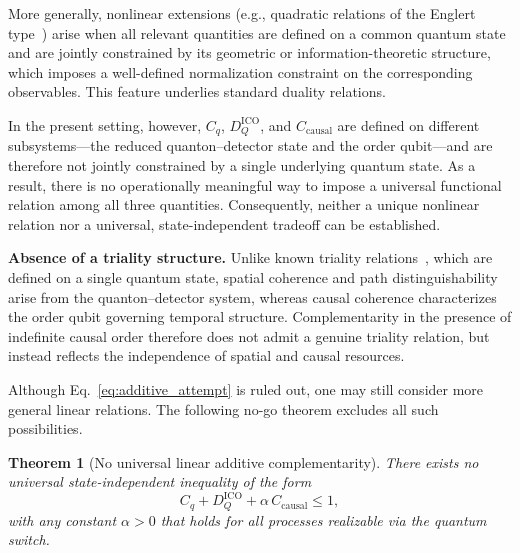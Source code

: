 \documentclass[aps,pra,reprint,superscriptaddress]{revtex4-2}
\newtheorem{theorem}{Theorem}[section]
\begin{document}
More generally, nonlinear extensions (e.g., quadratic relations of the Englert type~\cite{Englert}) arise when all relevant quantities are defined on a common quantum state and are jointly constrained by its geometric or information-theoretic structure, which imposes a well-defined normalization constraint on the corresponding observables. This feature underlies standard duality relations.

In the present setting, however, $C_q$, $D_Q^{\mathrm{ICO}}$, and $C_{\mathrm{causal}}$ are defined on different subsystems—the reduced quanton--detector state and the order qubit—and are therefore not jointly constrained by a single underlying quantum state. As a result, there is no operationally meaningful way to impose a universal functional relation among all three quantities. Consequently, neither a unique nonlinear relation nor a universal, state-independent tradeoff can be established.

\medskip

\noindent\textbf{Absence of a triality structure.}
Unlike known triality relations~\cite{Jakob2010,Qian2018,Roy2022}, which are defined on a single quantum state, spatial coherence and path distinguishability arise from the quanton--detector system, whereas causal coherence characterizes the order qubit governing temporal structure. Complementarity in the presence of indefinite causal order therefore does not admit a genuine triality relation, but instead reflects the independence of spatial and causal resources.

\medskip

Although Eq.~\eqref{eq:additive_attempt} is ruled out, one may still consider more general linear relations. The following no-go theorem excludes all such possibilities.

\begin{theorem}[No universal linear additive complementarity]
There exists no universal state-independent inequality of the form
\begin{equation}
C_q + D_Q^{\mathrm{ICO}} + \alpha\, C_{\mathrm{causal}} \le 1 ,
\label{eq:no_go_linear}
\end{equation}
with any constant $\alpha>0$ that holds for all processes realizable via the quantum switch.
\end{theorem}
\end{document}
